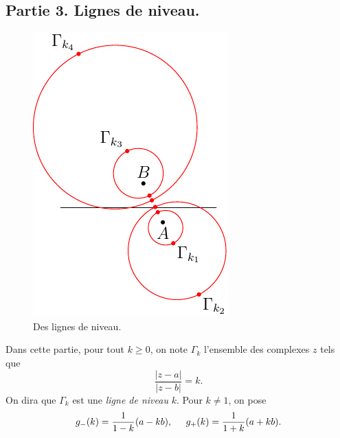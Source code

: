 \subsection*{Partie 3. Lignes de niveau.}
\begin{figure}[!h]
  \centering
  \includegraphics{./Ecomp14_1.pdf}
  \caption{Des lignes de niveau.}
  \label{fig:Ecomp14_1}
\end{figure}

Dans cette partie, pour tout $k \geq 0$, on note $\Gamma_k$ l'ensemble des complexes $z$ tels que
\begin{displaymath}
  \frac{|z-a|}{|z-b|} = k.
\end{displaymath}
On dira que $\Gamma_k$ est une \emph{ligne de niveau} $k$. Pour $k\neq 1$, on pose
\begin{displaymath}
  g_-(k) = \frac{1}{1-k}(a-kb),\hspace{0.5cm} g_+(k) = \frac{1}{1+k}(a+kb).
\end{displaymath}

